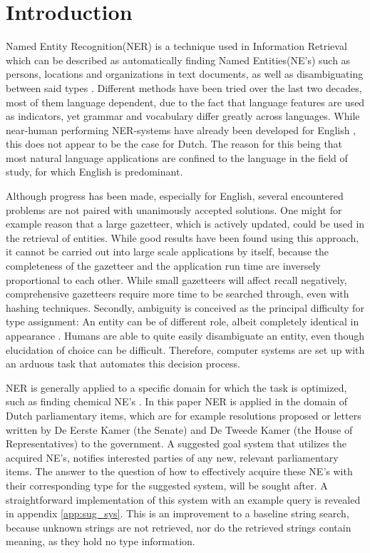 

\section{Introduction} \label{sec:intro}
Named Entity Recognition(NER) is a technique used in Information Retrieval which can be described as automatically finding Named Entities(NE's) such as persons, locations and organizations in text documents, as well as disambiguating between said types . Different methods have been tried over the last two decades, most of them language dependent, due to the fact that language features are used as indicators, yet grammar and vocabulary differ greatly across languages. While near-human performing NER-systems have already been developed for English , this does not appear to be the case for Dutch. The reason for this being that most natural language applications are confined to the language in the field of study, for which English is predominant.  

Although progress has been made, especially for English, several encountered problems are not paired with unanimously accepted solutions. 
One might for example reason that a large gazetteer, which is actively updated, could be used in the retrieval of entities. While good results have been found using this approach, it cannot be carried out into large scale applications by itself, because the completeness of the gazetteer and the application run time are inversely proportional to each other. While small gazetteers will affect recall negatively, comprehensive gazetteers require more time to be searched through, even with hashing techniques. 
Secondly, ambiguity is conceived as the principal difficulty for type assignment: An entity can be of different role, albeit completely identical in appearance . Humans are able to quite easily disambiguate an entity, even though elucidation of choice can be difficult. Therefore, computer systems are set up with an arduous task that automates this decision process.

NER is generally applied to a specific domain for which the task is optimized, such as finding chemical NE's \cite{rocktaschel2012chemspot}. 
In this paper NER is applied in the domain of Dutch parliamentary items, which are for example resolutions proposed or letters written by De Eerste Kamer (the Senate) and De Tweede Kamer (the House of Representatives) to the government. A suggested goal system that utilizes the acquired NE's, notifies interested parties of any new, relevant parliamentary items.
The answer to the question of how to effectively acquire these NE's with their corresponding type for the suggested system, will be sought after. A straightforward implementation of this system with an example query is revealed in appendix \ref{app:sug_sys}.
This is an improvement to a baseline string search, because unknown strings are not retrieved, nor do the retrieved strings contain meaning, as they hold no type information.

